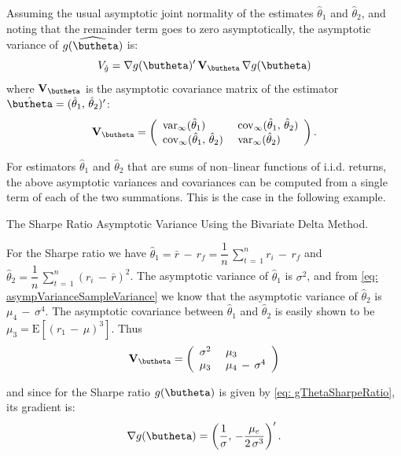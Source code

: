 \documentclass[graybox,envcountchap,sectrefs]{svmono}\usepackage[]{graphicx}\usepackage[]{xcolor}
\begin{document}
\begin{appendices}
Assuming the usual asymptotic joint normality of the estimates $\hat{\theta}_{1}$
and $\hat{\theta}_{2}$, and noting that the remainder term goes to
zero asymptotically, the asymptotic variance of $\widehat{g(\butheta)}$
is:
\begin{equation}
V_{\hat{g}}=\nabla g(\butheta)^{\prime}\,\mathbf{V}_{\butheta}\,\nabla g(\butheta)\label{eq: ghatVariance}
\end{equation}
where $\mathbf{V}_{\butheta}$ is the asymptotic covariance matrix
of the estimator $\hat{\butheta}=(\hat{\theta}_{1},\,\hat{\theta}_{2})^{\prime}$:
\begin{equation}
\mathbf{V}_{\butheta}=\left(\begin{array}{ll}
\mathrm{var}_{\infty}(\hat{\theta}_{1}) & \ \mathrm{cov}_{\infty}(\hat{\theta}_{1},\,\hat{\theta}_{2})\\
\mathrm{cov}_{\infty}(\hat{\theta}_{1},\,\hat{\theta}_{2}) & \ \mathrm{var}_{\infty}(\hat{\theta}_{2})
\end{array}\right).\label{eq: VthetaCovMat}
\end{equation}

For estimators $\hat{\theta}_{1}$ and $\hat{\theta}_{2}$ that are
sums of non--linear functions of i.i.d. returns, the above asymptotic
variances and covariances can be computed from a single term of each
of the two summations. This is the case in the following example.
\begin{example}
The Sharpe Ratio Asymptotic Variance Using the Bivariate Delta Method.
\end{example}
For the Sharpe ratio we have $\hat{\theta}_{1}=\bar{r}\,-\,r_{f}=\dfrac{1}{n}\,\sum_{t\,=\,1}^{n}r_{i}\,-\,r_{f}$
and $\hat{\theta}_{2}=\dfrac{1}{n}\,\sum_{t\,=\,1}^{n}(r_{i}\,-\,\bar{r})^{2}$.
The asymptotic variance of $\hat{\theta}_{1}$ is $\sigma^{2}$, and
from \eqref{eq: asympVarianceSampleVariance} we know that the asymptotic
variance of $\hat{\theta}_{2}$ is $\mu_{4}\,-\,\sigma^{4}$. The
asymptotic covariance between $\hat{\theta}_{1}$ and $\hat{\theta}_{2}$
is easily shown to be $\mu_{3}=\mathrm{E}\left[(r_{1}\,-\,\mu)^{3}\right]$.
Thus
\[
\mathbf{V}_{\butheta}=\left(\begin{array}{ll}
\sigma^{2} & \ \mu_{3}\\
\mu_{3} & \ \mu_{4}\,-\,\sigma^{4}
\end{array}\right)
\]

and since for the Sharpe ratio $g(\butheta)$ is given by \eqref{eq: gThetaSharpeRatio},
its gradient is:
\[
\nabla g(\butheta)=\left(\dfrac{1}{\sigma},\,-\dfrac{\mu_{e}}{2\,\sigma^{3}}\right)^{\prime}.
\]


\end{appendices}
\end{document}
